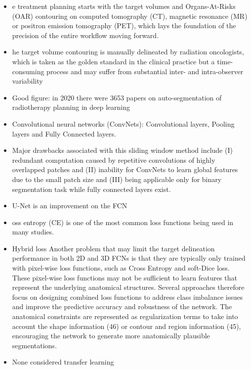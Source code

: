 \documentclass[11pt]{article}
\begin{document}
\begin{itemize}
    \item e treatment planning starts
    with the target volumes and Organs-At-Risks (OAR)
    contouring on computed tomography (CT), magnetic
    resonance (MR) or positron emission tomography (PET),
    which lays the foundation of the precision of the entire
    workflow moving forward.
    \item he target volume contouring
    is manually delineated by radiation oncologists, which is
    taken as the golden standard in the clinical practice but a
    time-consuming process and may suffer from substantial
    inter- and intra-observer variability
    \item Good figure: in 2020 there were 3653 papers on auto-segmentation of radiotherapy planning in deep learning
    \item Convolutional neural networks (ConvNets): Convolutional layers, Pooling layers and Fully Connected
    layers.
    \item Major drawbacks associated with this sliding window method include (I) redundant computation caused by repetitive convolutions of highly overlapped patches
    and (II) inability for ConvNets to learn global features due
    to the small patch size and (III) being applicable only for
    binary segmentation task while fully connected layers exist.
    \item U-Net is an improvement on the FCN
    \item oss entropy (CE)
    is one of the most common loss functions being used in
    many studies.
    \item Hybrid loss
    Another problem that may limit the target delineation
    performance in both 2D and 3D FCNs is that they are
    typically only trained with pixel-wise loss functions, such
    as Cross Entropy and soft-Dice loss. These pixel-wise
    loss functions may not be sufficient to learn features that
    represent the underlying anatomical structures. Several
    approaches therefore focus on designing combined loss
    functions to address class imbalance issues and improve the
    predictive accuracy and robustness of the network. The
    anatomical constraints are represented as regularization
    terms to take into account the shape information (46)
    or contour and region information (45), encouraging
    the network to generate more anatomically plausible
    segmentations.
    \item None considered transfer learning
\end{itemize}
\end{document}
